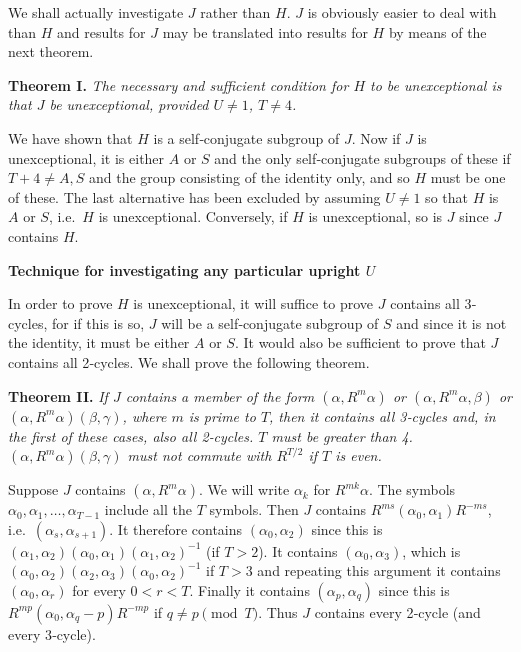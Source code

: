 \documentclass[12pt]{article}
\begin{document}
\medskip

We shall actually investigate $J$ rather than $H$. $J$ is obviously easier to deal with than $H$ and results for $J$ may be translated into results for $H$ by means of the next theorem.

\bigskip
\noindent
{\bf Theorem I.} {\em The necessary and sufficient condition for $H$ to be unexceptional is that $J$ be unexceptional, provided $U \neq 1$, $T \neq 4$.}

\medskip

We have shown that $H$ is a self‐conjugate subgroup of $J$. Now if $J$ is unexceptional, it is either $A$ or $S$ and the only self‐conjugate subgroups of these if $T + 4 \neq A, S$ and the group consisting of the identity only, and so $H$ must be one of these. The last alternative has been excluded by assuming $U \neq 1$ so that $H$ is $A$ or $S$, i.e.\ $H$ is unexceptional. Conversely, if $H$ is unexceptional, so is $J$ since $J$ contains $H$.

\bigskip

\noindent
{\bf Technique for investigating any particular upright $U$}

\medskip

In order to prove $H$ is unexceptional, it will suffice to prove $J$ contains all 3‐cycles, for if this is so, $J$ will be a self‐conjugate subgroup of $S$ and since it is not the identity, it must be either $A$ or $S$. It would also be sufficient to prove that $J$ contains all 2‐cycles. We shall prove the following theorem.

\bigskip

\noindent
{\bf Theorem II.} 
{\em If $J$ contains a member of the form $(\alpha, R^m \alpha)$ or $(\alpha, R^m \alpha, \beta)$ or $(\alpha, R^m \alpha)(\beta, \gamma)$, where $m$ is prime to $T$, then it contains all 3‐cycles and, in the first of these cases, also all 2‐cycles. $T$ must be greater than 4. $(\alpha, R^m \alpha)(\beta, \gamma)$ must not commute with $R^{T/2}$ if $T$ is even.}

\medskip

Suppose $J$ contains $(\alpha, R^m \alpha)$. We will write $\alpha_k$ for $R^{mk}\alpha$. The symbols $\alpha_0, \alpha_1, \dots, \alpha_{T-1}$ include all the $T$ symbols. Then $J$ contains $R^{m s}(\alpha_0, \alpha_1) R^{-ms}$, i.e.\ $(\alpha_s, \alpha_{s+1})$. It therefore contains $(\alpha_0, \alpha_2)$ since this is $(\alpha_1,\alpha_2)(\alpha_0, \alpha_1)(\alpha_1, \alpha_2)^{-1}$ (if $T > 2$). It contains $(\alpha_0,\alpha_3)$, which is $(\alpha_0,\alpha_2)(\alpha_2,\alpha_3)(\alpha_0,\alpha_2)^{-1}$ if $T > 3$ and repeating this argument it contains $(\alpha_0, \alpha_r)$ for every $0 < r < T$. Finally it contains $(\alpha_p, \alpha_q)$ since this is $R^{m p}(\alpha_0, \alpha_q - p)R^{-mp}$ if $q \neq p \pmod{T}$. Thus $J$ contains every 2‐cycle (and every 3‐cycle).
\end{document}
